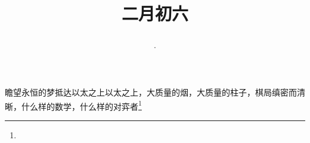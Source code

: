 \title{\date[d=15,m=3,y=2024][year:cn-y,年,month:cn,day:cn,日,·,weekday]·二月初六 }
瞻望永恒的梦抵达以太之上以太之上，大质量的烟，大质量的柱子，棋局缜密而清晰，什么样的数学，什么样的对弈者\footnote{ }

